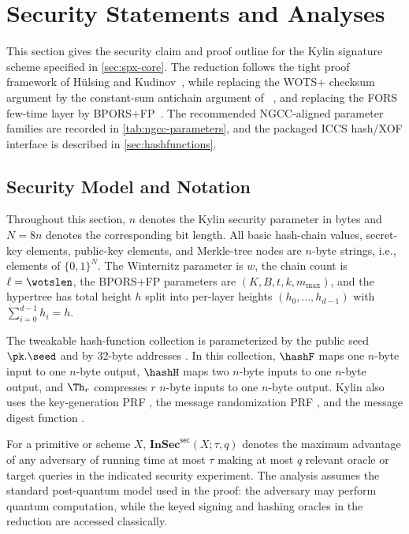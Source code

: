 \section{Security Statements and Analyses}
\label{sec:security-claims}

\providecommand{\InSec}[1]{\mathbf{InSec}^{\mathsf{#1}}}
\providecommand{\csenc}{\mathsf{cs\text{-}wots\text{-}encode}}
\providecommand{\Chain}{\mathsf{chain}}
\providecommand{\THFColl}{\mathcal{T}_{\mathsf{H}}}

This section gives the security claim and proof outline for the Kylin signature
scheme specified in \cref{sec:spx-core}.  The reduction follows the tight
\SPHINCSP proof framework of H\"ulsing and Kudinov~\cite{AC:HulKud22}, while
replacing the WOTS+ checksum argument by the constant-sum antichain argument of
\WOTSCS~\cite{optimalwots}, and replacing the FORS few-time layer by
BPORS+FP~\cite{bucketthinning,EPRINT:AbrKat25}.  The recommended NGCC-aligned parameter
families are recorded in \cref{tab:ngcc-parameters}, and the packaged ICCS
hash/XOF interface is described in \cref{sec:hashfunctions}.

\subsection{Security Model and Notation}
\label{sec:proof-model}

Throughout this section, $n$ denotes the Kylin security parameter in bytes and
$N=8n$ denotes the corresponding bit length.  All basic hash-chain values,
secret-key elements, public-key elements, and Merkle-tree nodes are $n$-byte
strings, i.e., elements of $\{0,1\}^{N}$.  The Winternitz parameter is $w$, the
\WOTSCS chain count is $\ell=\wotslen$, the BPORS+FP parameters are
$(K,B,t,k,m_{\max})$, and the hypertree has total height $h$ split into
per-layer heights $(h_0,\ldots,h_{d-1})$ with $\sum_{i=0}^{d-1}h_i=h$.

The tweakable hash-function collection is parameterized by the public seed
$\pk.\seed$ and by 32-byte addresses \ADRS.  In this collection, $\hashF$ maps
one $n$-byte input to one $n$-byte output, $\hashH$ maps two $n$-byte inputs to
one $n$-byte output, and $\Th_r$ compresses $r$ $n$-byte inputs to one
$n$-byte output.  Kylin also uses the key-generation PRF \PRF, the message
randomization PRF \PRFmsg, and the message digest function \hashmsg.

For a primitive or scheme $X$, $\InSec{sec}(X;\tau,q)$ denotes the maximum
advantage of any adversary of running time at most $\tau$ making at most $q$
relevant oracle or target queries in the indicated security experiment.  The
analysis assumes the standard post-quantum model used in the \SPHINCSP proof:
the adversary may perform quantum computation, while the keyed signing and
hashing oracles in the reduction are accessed classically.


